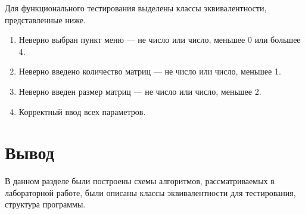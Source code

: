 Для функционального тестирования выделены классы эквивалентности, представленные ниже.

\begin{enumerate}
	\item Неверно выбран пункт меню --- не число или число, меньшее 0 или большее 4.
	\item Неверно введено количество матриц --- не число или число, меньшее 1.
	\item Неверно введен размер матриц --- не число или число, меньшее 2.
	\item Корректный ввод всех параметров.
\end{enumerate}


\section*{Вывод}

В данном разделе были построены схемы алгоритмов, рассматриваемых в лабораторной работе, были описаны классы эквивалентности для тестирования, структура программы.
